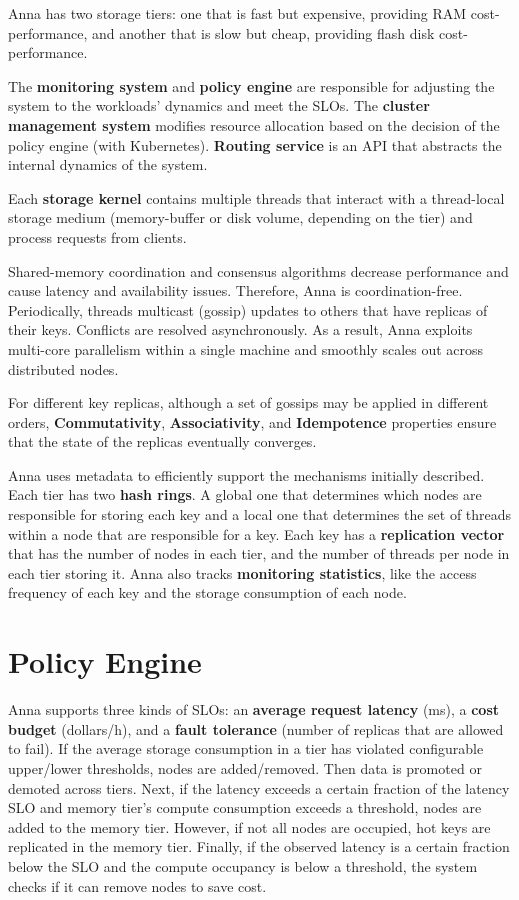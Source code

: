 \documentclass[14pt,oneside]{extreport}
\newcommand*\fpar{\hspace{1ex}}
\begin{document}
  \fpar Anna has two storage tiers: one that is fast but expensive, providing RAM cost-performance, and another that is slow but cheap, providing flash disk cost-performance.
  \par The \textbf{monitoring system} and \textbf{policy engine} are responsible for adjusting the system to the workloads’ dynamics and meet the SLOs. The \textbf{cluster management system} modifies resource allocation based on the decision of the policy engine (with Kubernetes). \textbf{Routing service} is an API that abstracts the internal dynamics of the system.
  \par Each \textbf{storage kernel} contains multiple threads that interact with a thread-local storage medium (memory-buffer or disk volume, depending on the tier) and process requests from clients.
  \par Shared-memory coordination and consensus algorithms decrease performance and cause latency and availability issues. Therefore, Anna is coordination-free. Periodically, threads multicast (gossip) updates to others that have replicas of their keys. Conflicts are resolved asynchronously. As a result, Anna exploits multi-core parallelism within a single machine and smoothly scales out across distributed nodes.
  \par For different key replicas, although a set of gossips may be applied in different orders, \textbf{Commutativity}, \textbf{Associativity}, and \textbf{Idempotence} properties ensure that the state of the replicas eventually converges.
  \par Anna uses metadata to efficiently support the mechanisms initially described. Each tier has two \textbf{hash rings}. A global one that determines which nodes are responsible for storing each key and a local one that determines the set of threads within a node that are responsible for a key. Each key has a \textbf{replication vector} that has the number of nodes in each tier, and the number of threads per node in each tier storing it. Anna also tracks \textbf{monitoring statistics}, like the access frequency of each key and the storage consumption of each node.

  \section{Policy Engine}
  \fpar Anna supports three kinds of SLOs: an \textbf{average request latency} (ms), a \textbf{cost budget} (dollars/h), and a \textbf{fault tolerance} (number of replicas that are allowed to fail). If the average storage consumption in a tier has violated configurable upper/lower thresholds, nodes are added/removed. Then data is promoted or demoted across tiers. Next, if the latency exceeds a certain fraction of the latency SLO and memory tier’s compute consumption exceeds a threshold, nodes are added to the memory tier. However, if not all nodes are occupied, hot keys are replicated in the memory tier. Finally, if the observed latency is a certain fraction below the SLO and the compute occupancy is below a threshold, the system checks if it can remove nodes to save cost.
\end{document}
